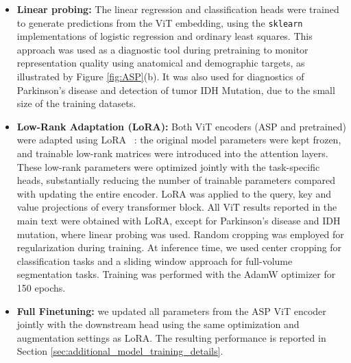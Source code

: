 \documentclass[pdflatex,sn-nature]{sn-jnl}%
\newif\ifhighlight
\newcommand{\rev}[1]{\ifhighlight{\color{blue}{}#1}\else#1\fi}%
\newcommand{\revdel}[1]{\ifhighlight{\color{red}\sout{#1}}\fi}
\theoremstyle{thmstyleone}%
\theoremstyle{thmstyletwo}%
\theoremstyle{thmstylethree}%
\begin{document}
\begin{itemize}
\item \textbf{Linear probing:} The linear regression and classification heads were trained to generate predictions from the ViT embedding, using the \texttt{sklearn} implementations of logistic regression and ordinary least squares. This approach was used as a diagnostic tool during pretraining to monitor representation quality using anatomical and demographic targets, as illustrated by Figure \ref{fig:ASP}(b). It was also used for diagnostics of Parkinson's disease and detection of tumor IDH Mutation, due to the small size of the training datasets.


\item \textbf{Low-Rank Adaptation (LoRA):} Both ViT encoders (ASP and pretrained) were adapted using LoRA ~\citep{zhu2024melo, hu2022lora}: the original model parameters were kept frozen, and trainable low-rank matrices were introduced into the attention layers. These low-rank parameters were optimized jointly with the task-specific heads, substantially reducing the number of trainable parameters compared with updating the entire encoder. \rev{LoRA was applied to the query, key and value projections of every transformer block. All ViT results reported in the main text were obtained with LoRA, except for Parkinson's disease and IDH mutation, where linear probing was used.} Random cropping was employed for regularization during training. At inference time, we used center cropping for classification tasks and a sliding window approach for full-volume segmentation tasks. Training was performed with the AdamW optimizer for 150 epochs. 

\item \textbf{Full Finetuning:} \revdel{For ablation experiments,} we updated all parameters from the ASP ViT encoder jointly with the downstream head using the same optimization and augmentation settings as LoRA. \rev{The resulting performance is reported in} \revdel{See Appendix} Section \ref{sec:additional_model_training_details}.

\end{itemize}
\end{document}
